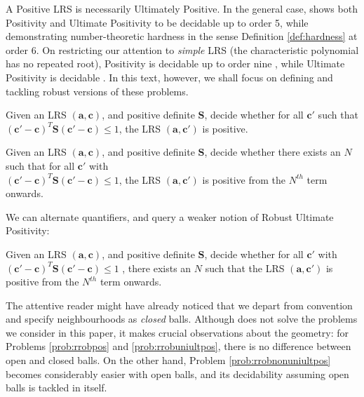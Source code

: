 A Positive LRS is necessarily Ultimately Positive. In the general case, \cite{joeljames3} shows both Positivity and Ultimate Positivity to be decidable up to order 5, while demonstrating number-theoretic hardness in the sense Definition \ref{def:hardness} at order $6$. On restricting our attention to \textit{simple} LRS (the characteristic polynomial has no repeated root), Positivity is decidable up to order nine \cite{ouaknine2014positivity}, while Ultimate Positivity is decidable \cite{ouaknine2014ultimate}. In this text, however, we shall focus on defining and tackling robust versions of these problems.

\begin{problem}
\label{prob:rrobpos}
Given an LRS $(\mathbf{a}, \mathbf{c})$, and positive definite $\mathbf{S}$, decide whether for all $\mathbf{c'}$ such that $(\mathbf{c'} - \mathbf{c})^T\mathbf{S}(\mathbf{c'} - \mathbf{c}) \le 1$, the LRS $(\mathbf{a}, \mathbf{c'})$ is positive.
\end{problem}

\begin{problem}
\label{prob:rrobuniultpos}
Given an LRS $(\mathbf{a}, \mathbf{c})$, and positive definite $\mathbf{S}$, decide whether there exists an $N$ such that for all $\mathbf{c'}$ with\\ $(\mathbf{c'} - \mathbf{c})^T\mathbf{S}(\mathbf{c'} - \mathbf{c}) \le 1$, the LRS $(\mathbf{a}, \mathbf{c'})$ is positive from the $N^{th}$ term onwards.
\end{problem}

We can alternate quantifiers, and query a weaker notion of Robust Ultimate Positivity:
\begin{problem}
\label{prob:rrobnonuniultpos}
Given an LRS $(\mathbf{a}, \mathbf{c})$, and positive definite $\mathbf{S}$, decide whether for all $\mathbf{c'}$ with $(\mathbf{c'} - \mathbf{c})^T\mathbf{S}(\mathbf{c'} - \mathbf{c}) \le 1$ , there exists an $N$ such that the LRS $(\mathbf{a}, \mathbf{c'})$ is positive from the $N^{th}$ term onwards.
\end{problem}

The attentive reader might have already noticed that we depart from convention and specify neighbourhoods as \textit{closed} balls. Although \cite{originalarxiv} does not solve the problems we consider in this paper, it makes crucial observations about the geometry: for Problems \ref{prob:rrobpos} and \ref{prob:rrobuniultpos}, there is no difference between open and closed balls. On the other hand, Problem \ref{prob:rrobnonuniultpos} becomes considerably easier with open balls, and its decidability assuming open balls is tackled in \cite{originalarxiv} itself.

